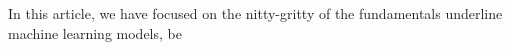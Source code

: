 In this article, we have focused on the nitty-gritty of the fundamentals underline machine learning models, be